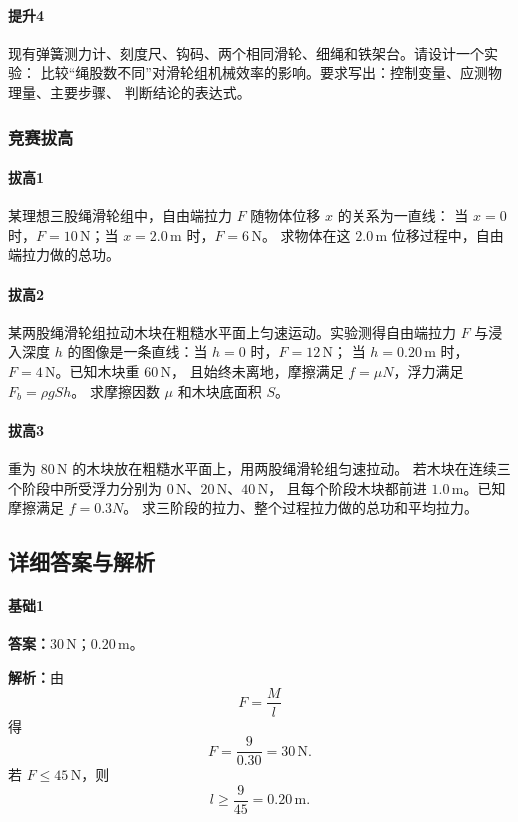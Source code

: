 \documentclass[12pt,a4paper]{ctexart}
\newcommand{\Ans}[1]{\par\noindent\textbf{答案：}#1\par}
\newcommand{\Sol}[1]{\par\noindent\textbf{解析：}#1\par}
\begin{document}
\paragraph{提升4}
现有弹簧测力计、刻度尺、钩码、两个相同滑轮、细绳和铁架台。请设计一个实验：
比较“绳股数不同”对滑轮组机械效率的影响。要求写出：控制变量、应测物理量、主要步骤、
判断结论的表达式。

\subsubsection*{竞赛拔高}
\paragraph{拔高1}
某理想三股绳滑轮组中，自由端拉力 $F$ 随物体位移 $x$ 的关系为一直线：
当 $x=0$ 时，$F=10\,\mathrm{N}$；当 $x=2.0\,\mathrm{m}$ 时，$F=6\,\mathrm{N}$。
求物体在这 $2.0\,\mathrm{m}$ 位移过程中，自由端拉力做的总功。

\paragraph{拔高2}
某两股绳滑轮组拉动木块在粗糙水平面上匀速运动。实验测得自由端拉力
$F$ 与浸入深度 $h$ 的图像是一条直线：当 $h=0$ 时，$F=12\,\mathrm{N}$；
当 $h=0.20\,\mathrm{m}$ 时，$F=4\,\mathrm{N}$。已知木块重 $60\,\mathrm{N}$，
且始终未离地，摩擦满足 $f=\mu N$，浮力满足 $F_b=\rho gSh$。
求摩擦因数 $\mu$ 和木块底面积 $S$。

\paragraph{拔高3}
重为 $80\,\mathrm{N}$ 的木块放在粗糙水平面上，用两股绳滑轮组匀速拉动。
若木块在连续三个阶段中所受浮力分别为 $0\,\mathrm{N}$、$20\,\mathrm{N}$、$40\,\mathrm{N}$，
且每个阶段木块都前进 $1.0\,\mathrm{m}$。已知摩擦满足 $f=0.3N$。
求三阶段的拉力、整个过程拉力做的总功和平均拉力。

\subsection{详细答案与解析}

\paragraph{基础1}
\Ans{$30\,\mathrm{N}$；$0.20\,\mathrm{m}$。}
\Sol{由
\[
F=\frac{M}{l}
\]
得
\[
F=\frac{9}{0.30}=30\,\mathrm{N}.
\]
若 $F\le 45\,\mathrm{N}$，则
\[
l\ge \frac{9}{45}=0.20\,\mathrm{m}.
\]}
\end{document}
